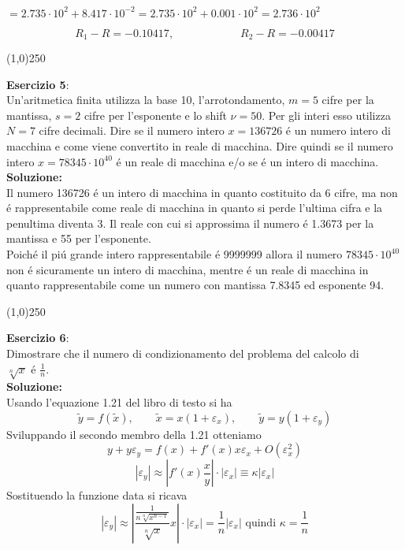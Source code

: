 $= 2.735\cdot10^2+8.417 \cdot 10^{-2} = 2.735 \cdot 10^2 + 0.001 \cdot 10^2 = 2.736 \cdot 10^2$

$$R_1 - R = -0.10417, \qquad\qquad\qquad R_2 - R = -0.00417$$

\begin{center}
\line(1,0){250}
\end{center}

\textbf{Esercizio 5}:\\Un'aritmetica finita utilizza la base 10,
l'arrotondamento, $m = 5$ cifre per la mantissa, $s = 2$ cifre per l'esponente e
lo shift $\nu = 50$. Per gli interi esso utilizza $N = 7$ cifre decimali. Dire
se il numero intero $x = 136726$ \'e un numero intero di macchina e come viene
convertito in reale di macchina. Dire quindi se il numero intero $x =
78345\cdot10^{40}$ \'e un reale di macchina e/o se \'e un intero di macchina.\\

\textbf{Soluzione:}\\Il numero 136726 \'e un intero di macchina in quanto
costituito da 6 cifre, ma non \'e rappresentabile come reale di macchina in
quanto si perde l'ultima cifra e la penultima diventa 3. Il reale con cui si
approssima il numero \'e 1.3673 per la mantissa e 55 per l'esponente.\\
Poich\'e il pi\'u grande intero rappresentabile \'e 9999999 allora il numero
$78345\cdot10^{40}$ non \'e sicuramente un intero di macchina, mentre \'e un
reale di macchina in quanto rappresentabile come un numero con mantissa 7.8345
ed esponente 94.

\begin{center}
\line(1,0){250}
\end{center}

\newpage\textbf{Esercizio 6}:\\Dimostrare che il numero di condizionamento del
problema del calcolo di\\ $\sqrt[n]{x}$ \'e $\frac{1}{n}$.\\

\textbf{Soluzione:}\\ Usando l'equazione 1.21 del libro di testo si ha
\begin{equation*}
\tilde{y} = f(\tilde{x}), \qquad \tilde{x} = x(1+\varepsilon_x), \qquad
\tilde{y} = y(1+\varepsilon_y)
\end{equation*} 
Sviluppando il secondo membro della 1.21 otteniamo
\begin{equation*}
y+y\varepsilon_y = f(x) + f'(x)x\varepsilon_x + O(\varepsilon_{x}^2)
\end{equation*} 
\begin{equation*}
|\varepsilon_y| \approx \left|f'(x)\frac{x}{y}\right|\cdot|\varepsilon_x|
\equiv \kappa|\varepsilon_x|
\end{equation*} 
Sostituendo la funzione data si ricava
\begin{equation*}
|\varepsilon_y| \approx
\left|\frac{\frac{1}{n\sqrt[n]{x^{n-1}}}}{\sqrt[n]{x}}x\right|\cdot|\varepsilon_x|
= \frac{1}{n}|\varepsilon_x|\text{ quindi } 
\kappa = \frac{1}{n}\end{equation*}

